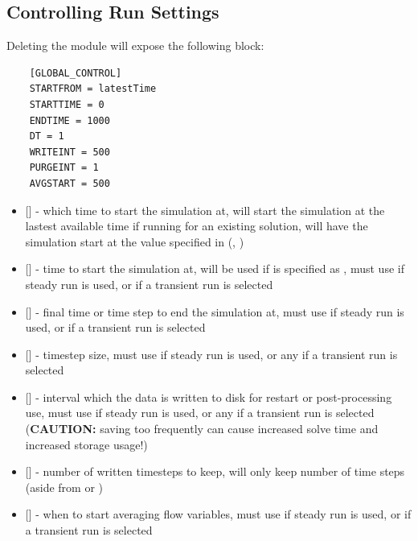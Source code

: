 \subsection{Controlling Run Settings}
Deleting the module  will expose the following block:
\begin{lstlisting}
    [GLOBAL_CONTROL]
    STARTFROM = latestTime
    STARTTIME = 0
    ENDTIME = 1000
    DT = 1
    WRITEINT = 500
    PURGEINT = 1
    AVGSTART = 500
\end{lstlisting}
\begin{itemize}
    \item {} [] - which time to start the simulation at,  will start the simulation at the lastest available time if running for an existing solution,  will have the simulation start at the value specified in  (, )

    \item {} [] - time to start the simulation at, will be used if  is specified as , must use  if steady run is used, or  if a transient run is selected

    \item {} [] - final time or time step to end the simulation at, must use  if steady run is used, or  if a transient run is selected

    \item {} [] - timestep size, must use  if steady run is used, or any  if a transient run is selected
    
    \item {} [] - interval which the data is written to disk for restart or post-processing use, must use  if steady run is used, or any  if a transient run is selected (\textbf{CAUTION:} saving too frequently can cause increased solve time and increased storage usage!)
    
    \item {} [] - number of written timesteps to keep, will only keep  number of time steps (aside from  or ) 
    
    \item {} [] - when to start averaging flow variables, must use  if steady run is used, or  if a transient run is selected
\end{itemize}

